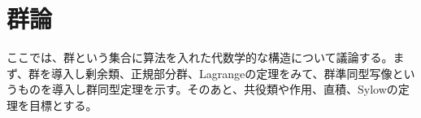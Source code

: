 \documentclass[a4paper]{jsarticle}
\begin{document}
\section{群論}
ここでは、群という集合に算法を入れた代数学的な構造について議論する。まず、群を導入し剰余類、正規部分群、Lagrangeの定理をみて、群準同型写像というものを導入し群同型定理を示す。そのあと、共役類や作用、直積、Sylowの定理を目標とする。
\end{document}
